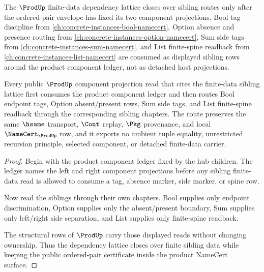 The $\ProdUp$ finite-data dependency lattice closes over sibling routes only after the ordered-pair envelope has fixed its two component projections. Bool tag discipline from \autoref{ch:concrete-instances-bool-namecert}, Option absence and presence routing from \autoref{ch:concrete-instances-option-namecert}, Sum side tags from \autoref{ch:concrete-instances-sum-namecert}, and List finite-spine readback from \autoref{ch:concrete-instances-list-namecert} are consumed as displayed sibling rows around the product component ledger, not as detached host projections.

\begin{lemma}
\label{lem:prod-finite-data-dependency-lattice-closure}
Every public $\ProdUp$ component projection read that cites the finite-data sibling lattice first consumes the product component ledger and then routes Bool endpoint tags, Option absent/present rows, Sum side tags, and List finite-spine readback through the corresponding sibling chapters. The route preserves the same $\hsame$ transport, $\Cont$ replay, $\Pkg$ provenance, and local $\NameCert_{\ProdUp}$ row, and it exports no ambient tuple equality, unrestricted recursion principle, selected component, or detached finite-data carrier.
\end{lemma}
\begin{proof}
Begin with the product component ledger fixed by the hub children. The ledger names the left and right component projections before any sibling finite-data read is allowed to consume a tag, absence marker, side marker, or spine row.

Now read the siblings through their own chapters. Bool supplies only endpoint discrimination, Option supplies only the absent/present boundary, Sum supplies only left/right side separation, and List supplies only finite-spine readback.

The structural rows of $\ProdUp$ carry those displayed reads without changing ownership. Thus the dependency lattice closes over finite sibling data while keeping the public ordered-pair certificate inside the product NameCert surface.
\end{proof}
